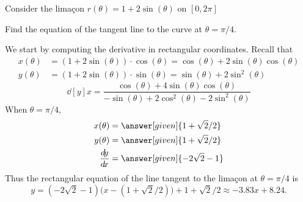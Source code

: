 \documentclass{ximera}
\begin{document}
\begin{example}
  Consider the lima\c con $r(\theta) =1+2\sin(\theta)$ on $[0,2\pi]$
  \begin{image}
  \end{image}
  Find the equation of the tangent line to the curve at
  $\theta=\pi/4$.
  \begin{explanation}
    We start by computing the derivative in rectangular coordinates. Recall that
    \begin{align*}
      x(\theta) &= \left(1+2\sin(\theta)\right)\cdot \cos(\theta) = \cos(\theta)+2\sin(\theta)\cos(\theta)\\
      y(\theta) &= \left(1+2\sin(\theta)\right)\cdot \sin(\theta) = \sin(\theta)+2\sin^2(\theta)
    \end{align*}
    \[
    \dd[y]{x} = \frac{\cos(\theta) + 4\sin(\theta)\cos(\theta)}{-\sin(\theta) + 2\cos^2(\theta)-2\sin^2(\theta)}
    \]
    When $\theta=\pi/4$,
    \begin{align*}
      x(\theta) &= \answer[given]{1+\sqrt{2}/2}\\
      y(\theta) &=\answer[given]{1+\sqrt{2}/2}\\
    \dd[y]{x} &=\answer[given]{-2\sqrt{2}-1}
    \end{align*}
     Thus the rectangular equation of the line tangent to the lima\c con at $\theta=\pi/4$ is
    \[
    y=(-2\sqrt{2}-1)\big(x-(1+\sqrt{2}/2)\big)+1+\sqrt{2}/2 \approx  -3.83 x+8.24.
    \]
    \begin{prompt}
    \end{prompt}
  \end{explanation}
\end{example}
\end{document}
